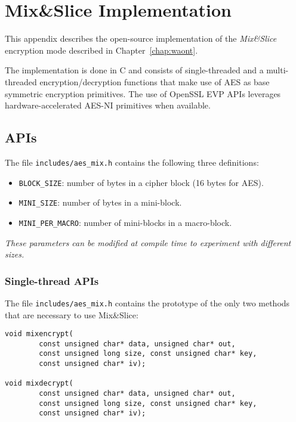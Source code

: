 \chapter[Mix\&Slice Implementation]{Mix\&Slice Implementation}

This appendix describes the open-source implementation of the \emph{Mix\&Slice} encryption mode described in Chapter~\ref{chap:waont}.

The implementation is done in C and consists of single-threaded and a
multi-threaded encryption/decryption functions that make use of AES as
base symmetric encryption primitives. The use of OpenSSL EVP APIs
leverages hardware-accelerated AES-NI primitives when available.

\section{APIs}\label{usage}

The file \texttt{includes/aes\_mix.h} contains the following three
definitions:

\begin{itemize}
\tightlist
\item
  \texttt{BLOCK\_SIZE}: number of bytes in a cipher block (16 bytes for
  AES).
\item
  \texttt{MINI\_SIZE}: number of bytes in a mini-block.
\item
  \texttt{MINI\_PER\_MACRO}: number of mini-blocks in a macro-block.
\end{itemize}

\emph{These parameters can be modified at compile time to experiment with
different sizes.}

\subsection{Single-thread APIs}\label{single-thread-apis}

The file \texttt{includes/aes\_mix.h} contains the prototype of the only
two methods that are necessary to use Mix\&Slice:

\begin{verbatim}
void mixencrypt(
        const unsigned char* data, unsigned char* out,
        const unsigned long size, const unsigned char* key,
        const unsigned char* iv);

void mixdecrypt(
        const unsigned char* data, unsigned char* out,
        const unsigned long size, const unsigned char* key,
        const unsigned char* iv);
\end{verbatim}

